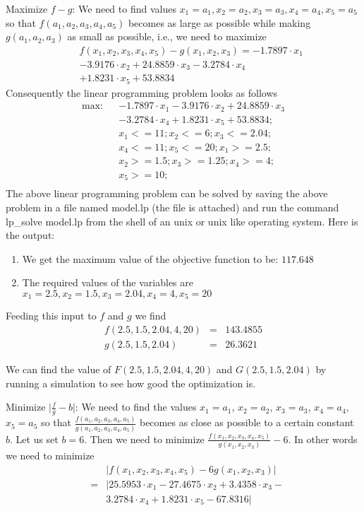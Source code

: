 \documentclass[journal]{IEEEtran}
\begin{document}
Maximize $f - g$:
We need to find values $x_1 = a_1,x_2 = a_2,x_3 = a_3,x_4 = a_4,x_5 = a_5$ so that $f(a_1,a_2,a_3,a_4,a_5)$ becomes as large as possible while making $g(a_1,a_2,a_3)$ as small as possible, i.e., we need to maximize
	\begin{eqnarray}
		& &f(x_1,x_2,x_3,x_4,x_5) - g(x_1,x_2,x_3) = -1.7897 \cdot x_1 \nonumber \\
		& & - 3.9176 \cdot x_2 + 24.8859 \cdot x_3 - 3.2784 \cdot x_4  \nonumber \\
		& & + 1.8231 \cdot x_5 + 53.8834
	\end{eqnarray}
Consequently the linear programming problem looks as follows
	\begin{eqnarray*}
		\text{max:} & & -1.7897 \cdot x_1 - 3.9176 \cdot x_2 + 24.8859 \cdot x_3 \nonumber \\
		& &- 3.2784 \cdot x_4 + 1.8231 \cdot x_5 + 53.8834; \nonumber \\
		& & x_1 <= 11; x_2 <= 6; x_3 <= 2.04; \nonumber \\
		& & x_4 <= 11; x_5 <= 20; x_1 >= 2.5; \nonumber \\
		& & x_2 >= 1.5; x_3 >= 1.25;  x_4 >= 4; \nonumber \\
		& & x_5 >= 10; \nonumber\\
	\end{eqnarray*}
The above linear programming problem can be solved by saving the above problem in a file named \textsf{model.lp} (the file is attached) and run the command \textsf{lp\_solve model.lp} from the shell of an unix or unix like operating system. Here is the output:
\begin{enumerate}
	\item We get the maximum value of the objective function to be: $117.648$
	\item The required values of the variables are $x_1 = 2.5,x_2 = 1.5,x_3 = 2.04, x_4 = 4, x_5 = 20$
\end{enumerate}
Feeding this input to $f$ and $g$ we find
	\begin{eqnarray*}
		f(2.5, 1.5, 2.04, 4,20) &=& 143.4855\\
		g(2.5, 1.5, 2.04) &=& 26.3621
	\end{eqnarray*}

We can find the value of $F(2.5, 1.5, 2.04, 4,20)$ and $G(2.5, 1.5, 2.04)$ by running a simulation to see how good the optimization is.


Minimize $\vert\frac{f}{g}-b\vert$: We need to find the values $x_1 = a_1$, $x_2 = a_2$, $x_3 = a_3$, $x_4 = a_4$, $x_5 = a_5$ so that $\frac{f(a_1,a_2,a_3,a_4,a_5)}{g(a_1,a_2,a_3,a_4,a_5)}$ becomes as close as possible to a certain constant $b$. Let us set $b=6$. Then we need to minimize $\frac{f(x_1,x_2,x_3,x_4,x_5)}{g(x_1,x_2,x_3)}-6$. In other words we need to minimize 
	\begin{eqnarray*}
		& & \vert f(x_1,x_2,x_3,x_4,x_5) - 6 g(x_1,x_2,x_3) \vert\\
		&=& \vert 25.5953 \cdot x_1 - 27.4675 \cdot x_2 + 3.4358 \cdot x_3 - \nonumber \\
		& & 3.2784 \cdot x_4 + 1.8231 \cdot x_5 - 67.8316 \vert
	\end{eqnarray*}
\end{document}

